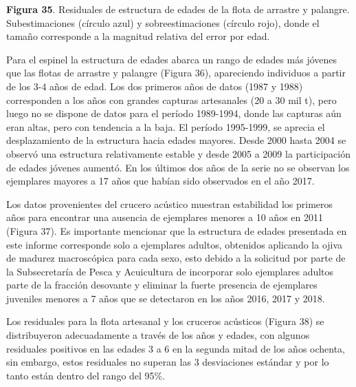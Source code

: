 \documentclass[
  spanish,
]{article}
\begin{document}
\small \textbf{Figura 35}. Residuales de estructura de edades de la
flota de arrastre y palangre. Subestimaciones (círculo azul) y
sobreestimaciones (círculo rojo), donde el tamaño corresponde a la
magnitud relativa del error por edad. \vspace{0.5cm} \normalsize

Para el espinel la estructura de edades abarca un rango de edades más
jóvenes que las flotas de arrastre y palangre (Figura 36), apareciendo
individuos a partir de los 3-4 años de edad. Los dos primeros años de
datos (1987 y 1988) corresponden a los años con grandes capturas
artesanales (20 a 30 mil t), pero luego no se dispone de datos para el
período 1989-1994, donde las capturas aún eran altas, pero con tendencia
a la baja. El período 1995-1999, se aprecia el desplazamiento de la
estructura hacia edades mayores. Desde 2000 hasta 2004 se observó una
estructura relativamente estable y desde 2005 a 2009 la participación de
edades jóvenes aumentó. En los últimos dos años de la serie no se
observan los ejemplares mayores a 17 años que habían sido observados en
el año 2017.

Los datos provenientes del crucero acústico muestran estabilidad los
primeros años para encontrar una ausencia de ejemplares menores a 10
años en 2011 (Figura 37). Es importante mencionar que la estructura de
edades presentada en este informe corresponde solo a ejemplares adultos,
obtenidos aplicando la ojiva de madurez macroscópica para cada sexo,
esto debido a la solicitud por parte de la Subsecretaría de Pesca y
Acuicultura de incorporar solo ejemplares adultos parte de la fracción
desovante y eliminar la fuerte presencia de ejemplares juveniles menores
a 7 años que se detectaron en los años 2016, 2017 y 2018.

Los residuales para la flota artesanal y los cruceros acústicos (Figura
38) se distribuyeron adecuadamente a través de los años y edades, con
algunos residuales positivos en las edades 3 a 6 en la segunda mitad de
los años ochenta, sin embargo, estos residuales no superan las 3
desviaciones estándar y por lo tanto están dentro del rango del 95\%.
\end{document}
